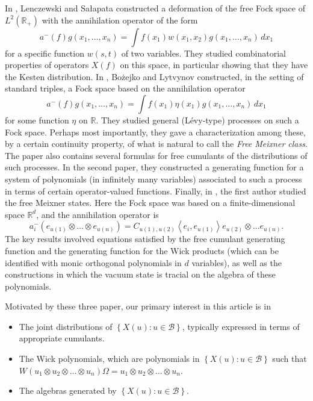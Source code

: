 \documentclass[12pt]{amsart}
\theoremstyle{definition}
\newcommand{\set}[1]{\left\{#1\right\}}
\newcommand{\mf}[1]{\mathbb{#1}}
\newcommand{\mc}[1]{\mathcal{#1}}
\newcommand{\ip}[2]{\left \langle{#1},{#2} \right \rangle}
\begin{document}
In \cite{Lenczewski-Salapata-Kesten}, Lenczewski and Sa{\l}apata constructed a deformation of the free Fock space of $L^2(\mf{R}_+)$ with the annihilation operator of the form
\[
a^-(f) g(x_1, \ldots, x_{n}) = \int f(x_1) w(x_1, x_2) g(x_1, \ldots, x_{n}) \,dx_1
\]
for a specific function $w(s,t)$ of two variables. They studied combinatorial properties of operators $X(f)$ on this space, in particular showing that they have the Kesten distribution. In \cite{Bozejko-Lytvynov-Meixner-I,Bozejko-Lytvynov-Meixner-II}, Bo{\.z}ejko and Lytvynov constructed, in the setting of standard triples, a Fock space based on the annihilation operator
\[
a^-(f) g(x_1, \ldots, x_{n}) = \int f(x_1) \eta(x_1) g(x_1, \ldots, x_{n}) \,dx_1
\]
for some function $\eta$ on $\mf{R}$. They studied general (L{\'e}vy-type) processes on such a Fock space. Perhaps most importantly, they gave a characterization among these, by a certain continuity property, of what is natural to call the \emph{Free Meixner class}. The paper also contains several formulas for free cumulants of the distributions of such processes. In the second paper, they constructed a generating function for a system of polynomials (in infinitely many variables) associated to such a process in terms of certain operator-valued functions. Finally, in \cite{AnsFree-Meixner}, the first author studied the free Meixner states. Here the Fock space was based on a finite-dimensional space $\mf{R}^d$, and the annihilation operator is
\[
a^-_i (e_{u(1)} \otimes \ldots \otimes e_{u(n)}) = C_{u(1), u(2)} \ip{e_i}{e_{u(1)}} e_{u(2)} \otimes \ldots e_{u(n)}.
\]
The key results involved equations satisfied by the free cumulant generating function and the generating function for the Wick products (which can be identified with monic orthogonal polynomials in $d$ variables), as well as the constructions in which the vacuum state is tracial on the algebra of these polynomials.

Motivated by these three paper, our primary interest in this article is in
\begin{itemize}
\item
The joint distributions of $\set{X(u) : u \in \mc{B}}$, typically expressed in terms of appropriate cumulants.
\item
The Wick polynomials, which are polynomials in $\set{X(u) : u \in \mc{B}}$ such that \\
$W(u_1 \otimes u_2 \otimes \ldots \otimes u_n) \Omega = u_1 \otimes u_2 \otimes \ldots \otimes u_n$.
\item
The algebras generated by $\set{X(u) : u \in \mc{B}}$.
\end{itemize}
\end{document}
